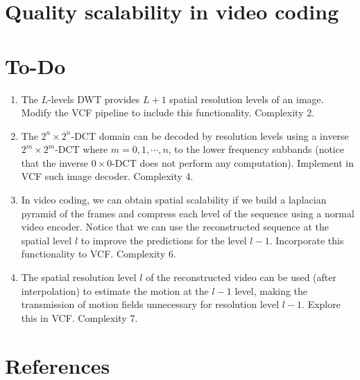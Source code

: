 \section{Quality scalability in video coding}

\section{To-Do}
\begin{enumerate}
\item The $L$-levels DWT provides $L+1$ spatial resolution levels of
  an image. Modify the VCF pipeline to include this
  functionality. Complexity 2.
\item The $2^n\times 2^n$-DCT domain can be decoded by resolution
  levels using a inverse $2^m\times 2^m$-DCT where $m=0,1,\cdots,n$,
  to the lower frequency subbands (notice that the inverse
  $0\times 0$-DCT does not perform any computation). Implement in VCF
  such image decoder. Complexity 4.
\item In video coding, we can obtain spatial scalability if we build a
  laplacian pyramid of the frames and compress each level of the
  sequence using a normal video encoder. Notice that we can use the
  reconstructed sequence at the spatial level $l$ to improve the
  predictions for the level $l-1$. Incorporate this functionality to
  VCF. Complexity 6.
\item The spatial resolution level $l$ of the reconstructed video can
  be used (after interpolation) to estimate the motion at the $l-1$
  level, making the transmission of motion fields unnecessary for
  resolution level $l-1$. Explore this in VCF. Complexity 7.
\end{enumerate}

\section{References}

\renewcommand{\addcontentsline}[3]{}%

